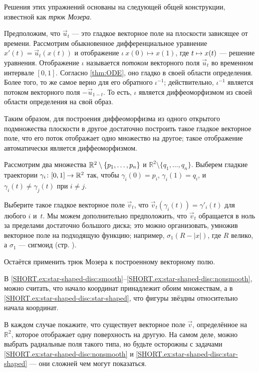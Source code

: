 \begin{multicols}{2}
Решения этих упражнений основаны на следующей общей конструкции, известной как \emph{трюк Мозера}.

Предположим, что $\vec u_t$ --- это гладкое векторное поле на плоскости зависящее от времени.
Рассмотрим обыкновенное дифференциальное уравнение $x'(t)=\vec u_t(x(t))$ и отображение $\iota\:x(0)\mapsto x(1)$, где $t\z\mapsto x(t)$ --- решение уравнения.
Отображение $\iota$ называется \emph{потоком} векторного поля $\vec u_t$ во временном интервале $[0,1]$.
Согласно \ref{thm:ODE}, оно гладко в своей области определения.
Более того, то же самое верно для его обратного $\iota^{-1}$;
действительно, $\iota^{-1}$ является потоком векторного поля $-\vec u_{1-t}$.
То есть, $\iota$ является диффеоморфизмом из своей области определения на свой образ.

Таким образом, для построения диффеоморфизма из одного открытого подмножества плоскости в другое достаточно построить такое гладкое векторное поле, что его поток отображает одно множество на другое;
такое отображение автоматически является диффеоморфизмом.


Рассмотрим два множества $\mathbb{R}^2\z\setminus\{p_1,\dots,p_n\}$ и $\mathbb{R}^2\setminus\{q_1,\dots,q_n\}$.
Выберем гладкие траектории $\gamma_i\:[0,1]\z\to \mathbb{R}^2$ так, чтобы $\gamma_i(0)=p_i$,
$\gamma_i(1)=q_i$, и $\gamma_i(t)\ne \gamma_j(t)$ при $i\ne j$.

Выберите такое гладкое векторное поле $\vec v_t$, что $\vec v_t(\gamma_i(t))=\gamma'_i(t)$ для любого $i$ и~$t$.
Мы можем дополнительно предположить, что $\vec v_t$ обращается в ноль за пределами достаточно большого диска; это можно организовать, умножив векторное поле на подходящую функцию;
например, $\sigma_1(R-|x|)$, где $R$ велико, а $\sigma_1$ --- сигмоид (стр. \pageref{page:sigma-function}).

Остаётся применить трюк Мозера к построенному векторному полю.

В \ref{SHORT.ex:star-shaped-disc:smooth}--\ref{SHORT.ex:star-shaped-disc:nonsmooth}, можно считать, что начало координат принадлежит обоим множествам, а в \ref{SHORT.ex:star-shaped-disc:star-shaped}, что фигуры звёздны относительно начала координат.

В каждом случае покажите, что существует векторное поле $\vec v$, определённое на $\mathbb{R}^2$, которое отображает одну поверхность на другую.
На самом деле, можно выбрать радиальные поля такого типа,
но будьте осторожны с задачами \ref{SHORT.ex:star-shaped-disc:nonsmooth} и \ref{SHORT.ex:star-shaped-disc:star-shaped} --- они сложней чем могут показаться.



\end{multicols}
